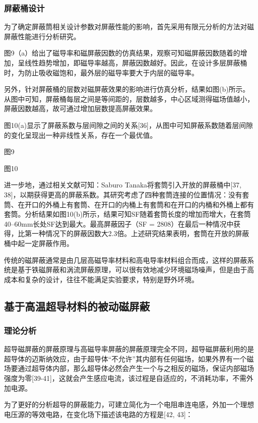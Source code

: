 \documentclass[a4paper,12pt，twoside]{ctexart}
\begin{document}
	\subsubsection{屏蔽桶设计}
	
	为了确定屏蔽筒相关设计参数对屏蔽性能的影响，首先采用有限元分析的方法对磁屏蔽性能进行分析研究。\par
	图9（a）给出了磁导率和磁屏蔽因数的仿真结果，观察可知磁屏蔽因数随着的增加，呈线性趋势增加，即磁导率越高，屏蔽因数越好。因此，在设计多层屏蔽桶时，为防止吸收磁饱和，最外层的磁导率要大于内层的磁导率。\par
	另外，针对屏蔽桶的层数对磁屏蔽效果的影响进行仿真分析，结果如图(b)所示。从图中可知，屏蔽桶每层之间是等间距的，层数越多，中心区域测得磁场值越小，屏蔽因数越高，故可通过增加层数提高屏蔽效果。\par
	图10(a)显示了屏蔽系数与层间隙之间的关系[36]，从图中可知屏蔽系数随着层间隙的变化呈现出一种非线性关系，存在一个最优值。\par
	图9\par
	图10\par 
	
	进一步地，通过相关文献可知：Saburo Tanaka将套筒引入开放的屏蔽桶中[37, 38]，以期获得更高的屏蔽系数。其研究考虑了四种套筒连接的位置情况：没有套筒、在开口的外桶上有套筒、在开口的内桶上有套筒和在开口的内桶和外桶上都有套筒。分析结果如图10(b)所示，结果可知SF随着套筒长度的增加而增大，在套筒40–60mm长处SF达到最大。最高屏蔽因子（SF = 2808）在最后一种情况中获得，比第一种情况下的屏蔽因数大2.3倍。上述研究结果表明，套筒在开放的屏蔽桶中起一定屏蔽作用。\par
	传统的磁屏蔽通常是由几层高磁导率材料和高电导率材料组合而成，这样的屏蔽系统是基于铁磁屏蔽和涡流屏蔽原理，可以很有效地减少环境磁场噪声，但是由于高成本和复杂的设计，往往不能满足实验要求，特别是野外环境。
	\subsection{基于高温超导材料的被动磁屏蔽}
	
	\subsubsection{理论分析}
	
	超导磁屏蔽的屏蔽原理与高磁导率屏蔽的屏蔽原理完全不同，超导磁屏蔽利用的是超导体的迈斯纳效应，由于超导体“不允许”其内部有任何磁场，如果外界有一个磁场要通过超导体内部，那么超导体必然会产生一个与之相反的磁场，保证内部磁场强度为零[39-41]，这就会产生感应电流，该过程是自适应的，不消耗功率，不需外加电源。\par
	为了更好的分析超导的屏蔽能力，可建立简化为一个电阻串连电感，外加一个理想电压源的等效电路，在变化场下描述该电路的方程是[42, 43]：\par
	
\end{document}
